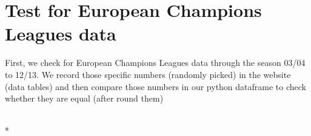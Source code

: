 \documentclass[letterpaper,10pt,english]{/usr/local/lib/python2.7/dist-packages/sphinx/texinputs/sphinxhowto}
\def\smaller{\fontsize{9.5pt}{9.5pt}\selectfont}
\begin{document}
\section{Test for European Champions Leagues data}First, we check for European Champions Leagues data through the season
03/04 to 12/13. We record those specific numbers (randomly picked) in
the website (data tables) and then compare those numbers in our python
dataframe to check whether they are equal (after round them)


    
        \vspace{6pt}
        \makebox[0.1\linewidth]{\smaller\hfill\tt\color{nbframe-in-prompt}In\hspace{4pt}{[}45{]}:\hspace{4pt}}\\*
        \vspace{-2.65\baselineskip}
\end{document}
